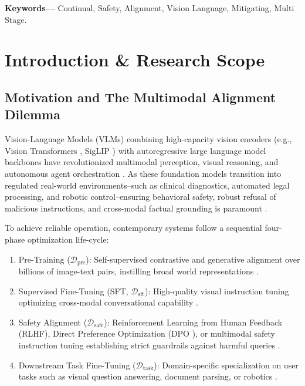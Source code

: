 \documentclass[10pt,twocolumn,letterpaper]{article}
\begin{document}
\noindent\textbf{Keywords---} Continual, Safety, Alignment, Vision Language, Mitigating, Multi Stage.







\section{Introduction \& Research Scope}



\subsection{Motivation and The Multimodal Alignment Dilemma}

Vision-Language Models (VLMs) combining high-capacity vision encoders (e.g., Vision Transformers \cite{arxiv_2010_11146}, SigLIP \cite{arxiv_2305_18290}) with autoregressive large language model backbones \cite{arxiv_2005_14165} have revolutionized multimodal perception, visual reasoning, and autonomous agent orchestration \cite{arxiv_2203_02155}. As these foundation models transition into regulated real-world environments--such as clinical diagnostics, automated legal processing, and robotic control--ensuring behavioral safety, robust refusal of malicious instructions, and cross-modal factual grounding is paramount \cite{arxiv_2312_03893}.

To achieve reliable operation, contemporary systems follow a sequential four-phase optimization life-cycle:
\begin{enumerate}
  \item Pre-Training ($\mathcal{D}_{\text{pre}}$): Self-supervised contrastive and generative alignment over billions of image-text pairs, instilling broad world representations \cite{arxiv_2010_11146}.
  \item Supervised Fine-Tuning (SFT, $\mathcal{D}_{\text{sft}}$): High-quality visual instruction tuning optimizing cross-modal conversational capability \cite{arxiv_2305_18290}.
  \item Safety Alignment ($\mathcal{D}_{\text{safe}}$): Reinforcement Learning from Human Feedback (RLHF), Direct Preference Optimization (DPO \cite{arxiv_2305_18290}), or multimodal safety instruction tuning establishing strict guardrails against harmful queries \cite{arxiv_2406_00584}.
  \item Downstream Task Fine-Tuning ($\mathcal{D}_{\text{task}}$): Domain-specific specialization on user tasks such as visual question answering, document parsing, or robotics \cite{arxiv_2405_01543}.
\end{enumerate}
\end{document}
